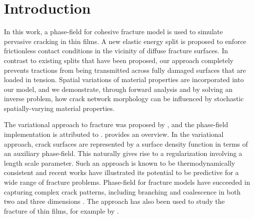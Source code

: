 \section{Introduction}
\label{section: cohesive/intro}

In this work, a phase-field for cohesive fracture model is used to simulate pervasive cracking in thin films. A new elastic energy split is proposed to enforce  frictionless contact conditions  in the vicinity of diffuse fracture surfaces. In contrast to existing splits that have been proposed, our approach completely prevents tractions from being transmitted across fully damaged surfaces that are loaded in tension. Spatial variations of material properties are incorporated into our model, and we demonstrate, through forward analysis and by solving an inverse problem, how crack network morphology can be influenced by stochastic spatially-varying material properties.

The variational approach to fracture was proposed by \citet{Francfort98}, and the phase-field implementation is attributed to \citet{Bourdin2000}.
\citet{bourdin2008variational} provides an overview.  In the variational approach, crack surfaces are represented by a  surface density function in terms of an auxiliary phase-field.  This naturally gives rise to a regularization involving a length scale parameter. Such an approach is known to be thermodynamically consistent and recent works have illustrated its potential to be predictive for a wide range of fracture problems. Phase-field for fracture models have succeeded in capturing complex crack patterns, including branching and coalescence in both two and three dimensions \cite{karma_2001, karma_2004, henry_2004, spatschek_2007, amor_2009}.  The approach has also been used to study the fracture of thin films, for example by \citet{baldelli2013delamination, baldelli2014variational}.

